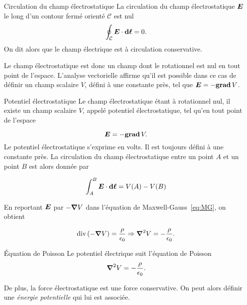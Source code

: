 \begin{defn}{Circulation du champ électrostatique}
La circulation du champ électrostatique $\vece$ le long d'un contour fermé
orienté $\mathcal{C}$ est nul
\begin{equation}
	\oint_\mathcal{C} \vece \cdot \dl = 0.
\end{equation}
On dit alors que le champ électrique est à circulation conservative.
\end{defn}

Le champ électrostatique est donc un champ dont le rotationnel est nul en tout 
point de l'espace. L'analyse vectorielle affirme qu'il est possible dans ce cas 
de définir un champ scalaire $V$,
défini à une constante près, 
tel que $\vece = -\gradient V$.

\begin{defn}{Potentiel électrostatique}
	Le champ électrostatique étant à rotationnel nul, il existe un 
	champ scalaire $V$, appelé potentiel électrostatique, tel qu'en
	tout point de l'espace

	\begin{equation}
		\vece = -\gradient V.
		\label{eq:potentiel}
	\end{equation}
	Le potentiel électrostatique s'exprime en volts. Il est toujours défini
	à une constante près.
	La circulation du 
	champ électrostatique entre un point $A$ et un point $B$ est alors donnée
	par

	\begin{equation}
		\int_A^B \vece \cdot \dl = V(A) - V(B)
	\end{equation}
\end{defn}

En reportant $\vece$ par $-\grad V$ dans l'équation de 
Maxwell-Gauss~\ref{eq:MG}, on obtient

\begin{equation*}
	\div(-\grad V) = \dfrac{\rho}{\epsilon_0} \Rightarrow \laplacien V = 
	              -\dfrac{\rho}{\epsilon_0}.
\end{equation*}

\begin{defn}{Équation de Poisson}
	Le potentiel électrique suit l'équation de Poisson
	\begin{equation}
		\laplacien V = -\dfrac{\rho}{\epsilon_0}.
	\end{equation}
\end{defn}

De plus, la force électrostatique est une force conservative. On peut alors
définir une \emph{énergie potentielle} qui lui est associée.

